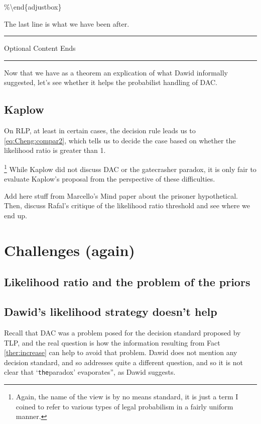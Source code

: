 \documentclass[10pt,dvipsnames,enabledeprecatedfontcommands]{scrartcl}
\newcommand{\intermezzob}{\nopagebreak 
	\begin{minipage}[c]{13cm}
	\begin{center}\rule{10cm}{0.4pt}

	\tiny{\sc Optional Content Ends}
	
	\vspace{-1mm}
	
	\rule{10cm}{0.4pt}\end{center}
	\end{minipage}
	}
\begin{document}
\%\textbackslash{}end\{adjustbox\}

\vspace{1mm}

The last line is what we have been after.

\intermezzob

Now that we have as a theorem an explication of what Dawid informally
suggested, let's see whether it helps the probabilist handling of DAC.

\hypertarget{kaplow-1}{%
\subsection{Kaplow}\label{kaplow-1}}

On RLP, at least in certain cases, the decision rule leads us to
\eqref{eq:Cheng:compar2}, which tells us to decide the case based on
whether the likelihood ratio is greater than 1.

\footnote{Again, the name of the view is by no means standard, it is  just a term I coined to refer to various types of legal probabilism in a fairly uniform manner.}
While Kaplow did not discuss DAC or the gatecrasher paradox, it is only
fair to evaluate Kaplow's proposal from the perspective of these
difficulties.

Add here stuff from Marcello's Mind paper about the prisoner
hypothetical. Then, discuss Rafal's critique of the likelihood ratio
threshold and see where we end up.

\hypertarget{challenges-again}{%
\section{Challenges (again)}\label{challenges-again}}

\hypertarget{likelihood-ratio-and-the-problem-of-the-priors}{%
\subsection{Likelihood ratio and the problem of the
priors}\label{likelihood-ratio-and-the-problem-of-the-priors}}

\hypertarget{dawids-likelihood-strategy-doesnt-help}{%
\subsection{Dawid's likelihood strategy doesn't
help}\label{dawids-likelihood-strategy-doesnt-help}}

Recall that DAC was a problem posed for the decision standard proposed
by TLP, and the real question is how the information resulting from Fact
\ref{ther:increase} can help to avoid that problem. Dawid does not
mention any decision standard, and so addresses quite a different
question, and so it is not clear that `\texttt{the}paradox'
evaporates'', as Dawid suggests.
\end{document}
